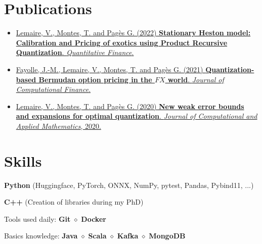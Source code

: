\documentclass[]{deedy-resume-openfont}
\begin{document}
\sectionsep
\sectionsep




	\sectionsep
	\vspace{\topsep}

	\section{Publications}
	\sectionsep
	\begin{itemize}
		\item[\diamond] \href{https://www.tandfonline.com/doi/abs/10.1080/14697688.2021.2023205?journalCode=rquf20}{Lemaire, V., Montes, T. and Pagès G. (2022) \textbf{Stationary Heston model: Calibration and Pricing of exotics using Product Recursive Quantization}. \textit{Quantitative Finance}.}

		\item[\diamond] \href{https://www.risk.net/journal-of-computational-finance/7869926/quantization-based-bermudan-option-pricing-in-the-foreign-exchange-world}{Fayolle, J.-M., Lemaire, V., Montes, T. and Pagès G. (2021) \textbf{Quantization-based Bermudan option pricing in the $FX$ world}. \textit{Journal of Computational Finance}.}

		\item[\diamond] \href{https://www.sciencedirect.com/science/article/abs/pii/S0377042719306752}{Lemaire, V., Montes, T. and Pagès G. (2020) \textbf{New weak error bounds and expansions for optimal quantization}. \textit{Journal of Computational and Applied Mathematics}, 2020.}
	\end{itemize}

\sectionsep


	\section{Skills}
	\sectionsep

	\sectionsep
	\vspace{0.1cm}
	\begin{tightemize}
		\item[\diamond] \textbf{Python} (Huggingface, PyTorch, ONNX, NumPy, pytest, Pandas, Pybind11, ...)
		\item[\diamond] \textbf{C++} (Creation of libraries during my PhD)
		\item[\diamond] Tools used daily: \textbf{Git} $\diamond$ \textbf{Docker}
		\item[\diamond] Basics knowledge: \textbf{Java} $\diamond$ \textbf{Scala} $\diamond$ \textbf{Kafka} $\diamond$ \textbf{MongoDB}
	\end{tightemize}
\end{document}
